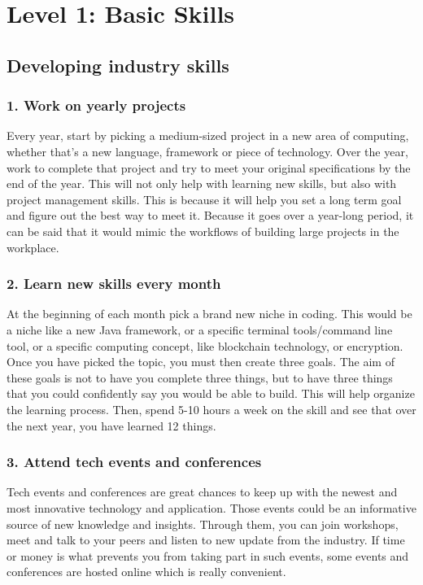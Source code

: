 \documentclass[a4paper, 11pt]{report}
\begin{document}
\tableofcontents
\newpage
\section{Level 1: Basic Skills}

\subsection{Developing industry skills}
    \subsubsection{1. Work on yearly projects}
    Every year, start by picking a medium-sized project in a new area of computing, whether that’s a new language, framework or piece of technology. Over the year, work to complete that project and try to meet your original specifications by the end of the year. This will not only help with learning new skills, but also with project management skills. This is because it will help you set a long term goal and figure out the best way to meet it. Because it goes over a year-long period, it can be said that it would mimic the workflows of building large projects in the workplace.
    \subsubsection{2. Learn new skills every month}
    At the beginning of each month pick a brand new niche in coding. This would be a niche like a new Java framework, or a specific terminal tools/command line tool, or a specific computing concept, like blockchain technology, or encryption. Once you have picked the topic, you must then create three goals. The aim of these goals is not to have you complete three things, but to have three things that you could confidently say you would be able to build. This will help organize the learning process. Then, spend 5-10 hours a week on the skill and see that over the next year, you have learned 12 things.
    \subsubsection{3. Attend tech events and conferences}
    Tech events and conferences are great chances to keep up with the newest and most innovative technology and application. Those events could be an informative source of new knowledge and insights. Through them, you can join workshops, meet and talk to your peers and listen to new update from the industry. If time or money is what prevents you from taking part in such events, some events and conferences are hosted online which is really convenient.
\end{document}
